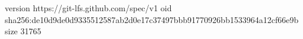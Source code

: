 version https://git-lfs.github.com/spec/v1
oid sha256:de10d9de0d9335512587ab2d0e17c37497bbb91770926bb1533964a12cf66e9b
size 31765
